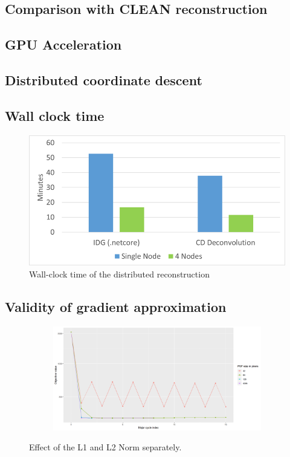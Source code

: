 \subsection{Comparison with CLEAN reconstruction}

\subsection{GPU Acceleration}

\subsection{Distributed coordinate descent}




\subsection{Wall clock time}
\begin{figure}[h]
	\centering
	\includegraphics[width=0.80\linewidth]{./chapters/10.results/wall-clock-time.png}
	\caption{Wall-clock time of the distributed reconstruction}
	\label{results:time:fig}
\end{figure}


\subsection{Validity of gradient approximation} \label{results:gradients}

\begin{figure}[h]
	\centering
	\begin{subfigure}[b]{1.0\linewidth}
		\includegraphics[width=\linewidth]{./chapters/10.results/gradient/size.png}
	\end{subfigure}
	
	\caption{Effect of the L1 and L2 Norm separately.}
	\label{results:gradients:size}
\end{figure}

